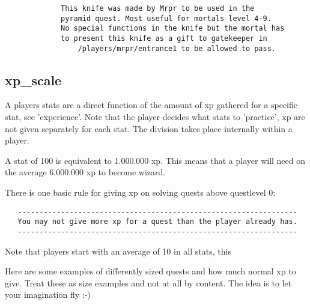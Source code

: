 \begin{verbatim}    
             This knife was made by Mrpr to be used in the
             pyramid quest. Most useful for mortals level 4-9.
             No special functions in the knife but the mortal has
             to present this knife as a gift to gatekeeper in
                 /players/mrpr/entrance1 to be allowed to pass.
\end{verbatim}



\subsection{xp\_scale}

A players stats are a direct function of the amount of xp gathered for
a specific stat, see 'experience'. Note that the player decides what
stats to 'practice', xp are not given separately for each stat. The 
division takes place internally within a player.

A stat of 100 is equivalent to 1.000.000 xp. This means that a player will
need on the average 6.000.000 xp to become wizard.

There is one basic rule for giving xp on solving quests above questlevel 0:

\begin{verbatim}
   -----------------------------------------------------------------
   You may not give more xp for a quest than the player already has.
   -----------------------------------------------------------------
\end{verbatim}

Note that players start with an average of 10 in all stats, this 

Here are some examples of differently sized quests and how much normal
xp to give. Treat these as size examples and not at all by content. The idea
is to let your imagination fly :-)

